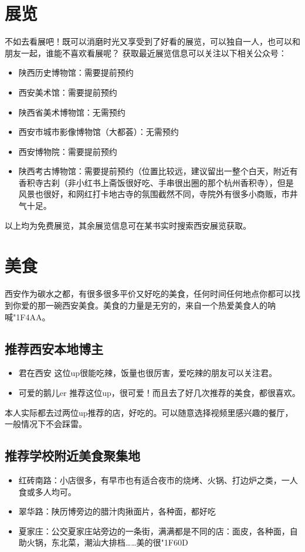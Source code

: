 \documentclass[zihao=-4,fontset=none]{Beautybook-CN}
\begin{document}
\section{展览}

不如去看展吧！既可以消磨时光又享受到了好看的展览，可以独自一人，也可以和朋友一起，谁能不喜欢看展呢？
获取最近展览信息可以关注以下相关公众号：
\begin{itemize}
\item 陕西历史博物馆：需要提前预约
\item 西安美术馆：需要提前预约
\item 陕西省美术博物馆：无需预约
\item 西安市城市影像博物馆（大都荟）：无需预约
\item 西安博物院：需要提前预约
\item 陕西考古博物馆：需要提前预约（位置比较远，建议留出一整个白天，附近有香积寺古刹（非小红书上斋饭很好吃、手串很出圈的那个杭州香积寺），但是风景也很好，和网红打卡地古寺的氛围截然不同，寺院外有很多小商贩，市井气十足。
\end{itemize}
以上均为免费展览，其余展览信息可在某书实时搜索西安展览获取。

\section{美食}

西安作为碳水之都，有很多很多平价又好吃的美食，任何时间任何地点你都可以找到你爱的那一碗西安美食。美食的力量是无穷的，来自一个热爱美食人的呐喊{\char"1F4AA}。

\subsection{推荐西安本地博主}


\begin{itemize}
\item 君在西安 这位up很能吃辣，饭量也很厉害，爱吃辣的朋友可以关注君。
\item 可爱的鹅儿er 推荐这位up，很可爱！而且去了好几次推荐的美食，都很喜欢。
\end{itemize}
本人实际都去过两位up推荐的店，好吃的。可以随意选择视频里感兴趣的餐厅，一般情况下不会踩雷。

\subsection{推荐学校附近美食聚集地}


\begin{itemize}
\item 红砖南路：小店很多，有早市也有适合夜市的烧烤、火锅、打边炉之类，一人食或多人均可。
\item 翠华路：陕历博旁边的腊汁肉揪面片，各种面，都好吃
\item 夏家庄：公交夏家庄站旁边的一条街，满满都是不同的店：面皮，各种面，自助火锅，东北菜，潮汕大排档……美的很{\char"1F60D}
\end{itemize}
\end{document}

